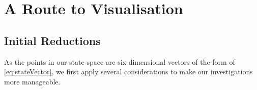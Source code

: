 \section{A Route to Visualisation} \label{sec:visualisation}


\subsection{Initial Reductions}


    As the points in our state space are six-dimensional vectors of the form of \cref{eq:stateVector},
    we first apply several considerations to make our investigations more manageable.

